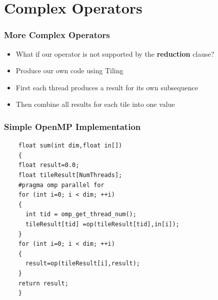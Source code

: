 \documentclass{beamer}
\begin{document}
  \section{Complex Operators}
\begin{frame}
	\frametitle{More Complex Operators}
\begin{itemize}
\item What if our operator is not supported by the \textbf{reduction} clause?

\item Produce our own code using Tiling

\item First each thread produces a result for its own subsequence

\item Then combine all results for each tile into one value
\end{itemize}
\end{frame}
  \begin{frame}[fragile=singleslide]
  	\frametitle{Simple OpenMP Implementation}
  	\begin{lstlisting}
  	float sum(int dim,float in[])
  	{
  	float result=0.0;
  	float tileResult[NumThreads];
  	#pragma omp parallel for
  	for (int i=0; i < dim; ++i)
  	{
  	  int tid = omp_get_thread_num();
  	  tileResult[tid] =op(tileResult[tid],in[i]);
  	}
  	for (int i=0; i < dim; ++i)
  	{
  	  result=op(tileResult[i],result);
  	}
  	return result;
  	}
  	\end{lstlisting}
  \end{frame}
  
\end{document}
